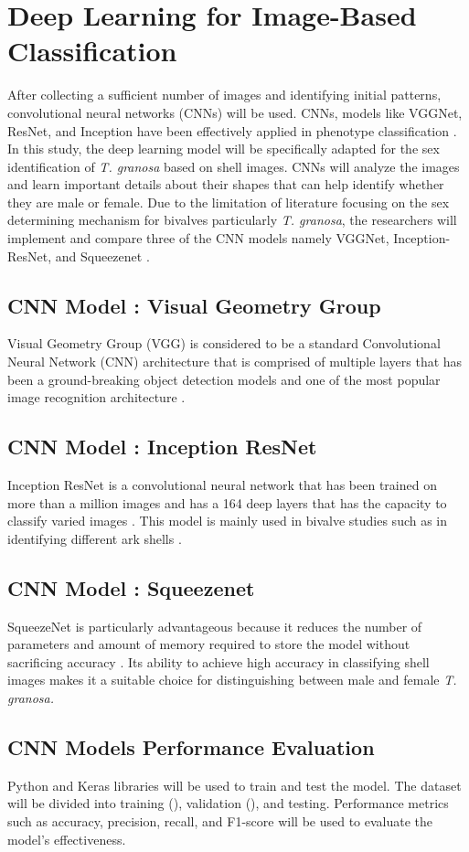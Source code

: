 \section{ Deep Learning for Image-Based Classification}
\label{sec:deeplearning}
After collecting a sufficient number of images and identifying initial patterns, convolutional neural networks (CNNs) will be used. CNNs, models like VGGNet, ResNet, and Inception have been effectively applied in phenotype classification \cite{kim2024}. In this study, the deep learning model will be specifically adapted for the sex identification of \textit{T. granosa} based on shell images. CNNs will analyze the images and learn important details about their shapes that can help identify whether they are male or female. Due to the limitation of literature focusing on the sex determining mechanism for bivalves particularly \textit{T. granosa}, the researchers will implement and compare three of the CNN models namely VGGNet, Inception-ResNet, and Squeezenet . 

\subsection{CNN Model : Visual Geometry Group}
Visual Geometry Group (VGG) is considered to be a standard Convolutional Neural Network (CNN) architecture that is comprised of multiple layers that has been a ground-breaking object detection models and one of the most popular image recognition architecture \cite{boesch2021}. 

\subsection{CNN Model : Inception ResNet}
Inception ResNet is a convolutional neural network that has been trained on more than a million images and has a  164 deep layers that has the capacity to classify varied images \cite{mathworks}. This model is mainly used in bivalve studies such as in identifying different ark shells \cite{kim2024}.  

\subsection{CNN Model : Squeezenet}
SqueezeNet is particularly advantageous because it reduces the number of parameters and amount of memory required to store the model without sacrificing accuracy \cite{koonce2021}. Its ability to achieve high accuracy in classifying shell images makes it a suitable choice for distinguishing between male and female \textit{T. granosa.}

\subsection{CNN Models Performance Evaluation}
Python and Keras libraries will be used to train and test the model. The dataset will be divided into training (), validation (), and testing. Performance metrics such as accuracy, precision, recall, and F1-score will be used to evaluate the model's effectiveness.